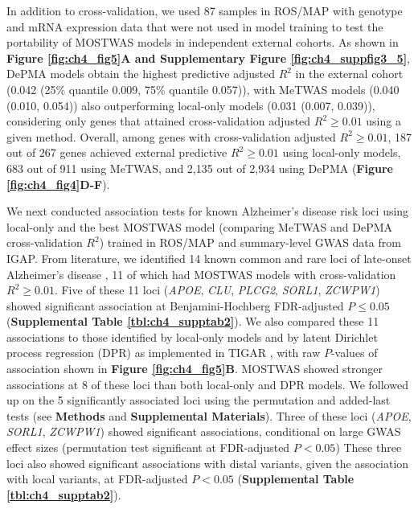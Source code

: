 In addition to cross-validation,
we used 87 samples in ROS/MAP
with genotype and mRNA expression data
that were not used in model training to
test the portability
of MOSTWAS models in independent
external cohorts. As shown in
\textbf{Figure \ref{fig:ch4_fig5}A and
Supplementary Figure \ref{fig:ch4_suppfig3_5}},
DePMA models obtain the highest
predictive adjusted $R^2$ in
the external cohort (0.042 (25\% quantile 0.009, 75\% quantile 0.057)), 
with MeTWAS models (0.040 (0.010, 0.054)) also outperforming
local-only
models (0.031 (0.007, 0.039)),
considering only genes that attained
cross-validation adjusted $R^2 \geq 0.01$
using a given method. Overall,
among genes with cross-validation
adjusted $R^2 \geq 0.01$, 187 out of 267 genes achieved
external predictive $R^2 \geq 0.01$
using local-only models, 683 out of 911 using
MeTWAS, and 2,135 out of 2,934 using DePMA
(\textbf{Figure \ref{fig:ch4_fig4}D-F}).

We next conducted association tests
for known Alzheimer's disease risk
loci using local-only and the best MOSTWAS model
(comparing MeTWAS and DePMA cross-validation $R^2$) 
trained
in ROS/MAP and summary-level GWAS
data from IGAP.
From literature, we identified
14 known common and rare loci of late-onset
Alzheimer's disease
\cite{Lambert2013Meta-analysisDisease,Reitz2014GeneticDisease,Sims2017RareDisease,Yuan2017TheDisease},
11 of which had MOSTWAS models
with cross-validation $R^2 \geq 0.01$.
Five of these 11
loci 
(\textit{APOE}, \textit{CLU}, 
\textit{PLCG2}, \textit{SORL1}, 
\textit{ZCWPW1}) showed significant association
at Benjamini-Hochberg FDR-adjusted $P \leq 0.05$
(\textbf{Supplemental Table \ref{tbl:ch4_supptab2}}).
We also compared these 11 associations to
those identified by local-only models
and by latent Dirichlet process regression (DPR)
as implemented in TIGAR \cite{Nagpal2019},
with raw $P$-values of association
shown in \textbf{Figure \ref{fig:ch4_fig5}B}.
MOSTWAS showed stronger associations at 8 of these
loci than both local-only
and DPR models. We followed up on
the 5 significantly associated loci
using the permutation
and added-last tests (see \textbf{Methods} and
\textbf{Supplemental Materials}).
Three of these loci 
(\textit{APOE}, \textit{SORL1}, \textit{ZCWPW1})
showed significant associations, conditional
on large GWAS effect sizes (permutation test 
significant at FDR-adjusted $P < 0.05$)
These three 
loci also showed significant associations with
distal variants, given the association with
local variants, at FDR-adjusted $P < 0.05$ (\textbf{Supplemental 
Table \ref{tbl:ch4_supptab2}}).

